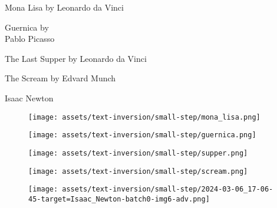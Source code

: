 \begin{figure*}[h]
\centering
\footnotesize
\begin{minipage}[t]{.025\textwidth}
     \vspace{0pt}
\end{minipage}%
\hspace{1ex}%
\begin{minipage}[t]{0.98\figwidth}
    \vspace{0pt}
    \begin{minipage}[t]{0.2\textwidth}
        \centering
        Mona Lisa by Leonardo da Vinci
    \end{minipage}%
    \begin{minipage}[t]{0.2\textwidth}
        \centering
        Guernica by\\Pablo Picasso
    \end{minipage}%
    \begin{minipage}[t]{0.2\textwidth}
        \centering
        The Last Supper by Leonardo da Vinci
    \end{minipage}%
    \begin{minipage}[t]{0.2\textwidth}
        \centering
        The Scream by Edvard Munch
    \end{minipage}%
    \begin{minipage}[t]{0.2\textwidth}
        \centering
        Isaac Newton
    \end{minipage}%
\end{minipage}


\vspace{0.5ex}
\begin{minipage}[t]{.025\textwidth}
     \vspace{0pt}
\end{minipage}%
\hspace{1ex}
\begin{minipage}[t]{0.98\figwidth}
    \vspace{0pt}
    \begin{subfigure}[t]{0.2\textwidth}
        \texttt{[image: assets/text-inversion/small-step/mona\_lisa.png]}
    \end{subfigure}%
    \begin{subfigure}[t]{0.2\textwidth}
        \texttt{[image: assets/text-inversion/small-step/guernica.png]}
    \end{subfigure}%
    \begin{subfigure}[t]{0.2\textwidth}
        \texttt{[image: assets/text-inversion/small-step/supper.png]}
    \end{subfigure}%
    \begin{subfigure}[t]{0.2\textwidth}
        \texttt{[image: assets/text-inversion/small-step/scream.png]}
    \end{subfigure}%
    \begin{subfigure}[t]{0.2\textwidth}
        \texttt{[image: assets/text-inversion/small-step/2024-03-06\_17-06-45-target=Isaac\_Newton-batch0-img6-adv.png]}
    \end{subfigure}%
\end{minipage}


\end{figure*}
